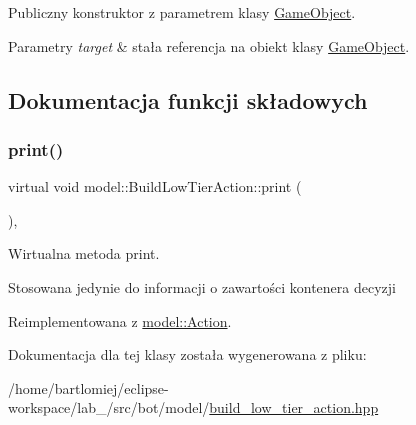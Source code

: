 Publiczny konstruktor z parametrem klasy \hyperlink{classmodel_1_1GameObject}{Game\+Object}. 


\begin{DoxyParams}{Parametry}
{\em target} & stała referencja na obiekt klasy \hyperlink{classmodel_1_1GameObject}{Game\+Object}. \\
\hline
\end{DoxyParams}


\subsection{Dokumentacja funkcji składowych}
\mbox{\label{classmodel_1_1BuildLowTierAction_a0917c29053656d5914125a30bcd51cce}} 
\subsubsection{\texorpdfstring{print()}{print()}}
{\footnotesize\ttfamily virtual void model\+::\+Build\+Low\+Tier\+Action\+::print (\begin{DoxyParamCaption}{ }\end{DoxyParamCaption})\hspace{0.3cm}{\ttfamily [inline]}, {\ttfamily [virtual]}}



Wirtualna metoda print. 

Stosowana jedynie do informacji o zawartości kontenera decyzji 

Reimplementowana z \hyperlink{classmodel_1_1Action_a2955dbb4a69e38a48aa07d730fe2d77c}{model\+::\+Action}.



Dokumentacja dla tej klasy została wygenerowana z pliku\+:\begin{DoxyCompactItemize}
\item 
/home/bartlomiej/eclipse-\/workspace/lab\+\_/src/bot/model/\hyperlink{build__low__tier__action_8hpp}{build\+\_\+low\+\_\+tier\+\_\+action.\+hpp}\end{DoxyCompactItemize}

